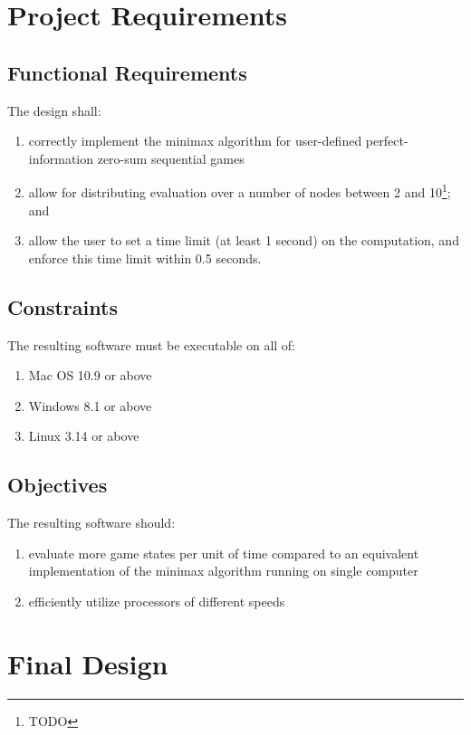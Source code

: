 \documentclass[pdftex,12pt,a4paper]{article}
\begin{document}
%
%
\section{Project Requirements}\label{sec:requirements}

\subsection{Functional Requirements}

The design shall:
\begin{enumerate}
\item correctly implement the minimax algorithm for user-defined perfect-information zero-sum sequential games
\item allow for distributing evaluation over a number of nodes between 2 and 10\footnote{TODO}; and
\item allow the user to set a time limit (at least 1 second) on the computation, and enforce this time limit within 0.5 seconds.
\end{enumerate}

\subsection{Constraints}\label{sec:constraints}

The resulting software must be executable on all of:
\begin{enumerate}
\item Mac OS 10.9 or above
\item Windows 8.1 or above
\item Linux 3.14 or above
\end{enumerate}

\subsection{Objectives}\label{sec:objectives}

The resulting software should:
\begin{enumerate}
\item evaluate more game states per unit of time compared to an equivalent implementation of the minimax algorithm running on single computer
\item\label{itm:obj-efficiency} efficiently utilize processors of different speeds
\end{enumerate}


\section{Final Design}
\end{document}
